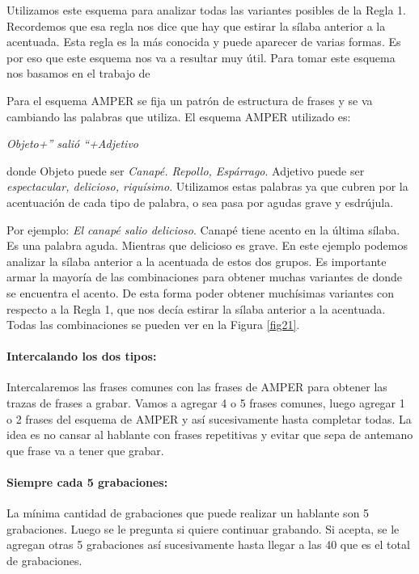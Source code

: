 Utilizamos este esquema para analizar todas las variantes posibles de la Regla 1. Recordemos que esa regla nos dice que hay que estirar la sílaba anterior a la acentuada. Esta regla es la más conocida y puede aparecer de varias formas. Es por eso que este esquema nos va a resultar muy útil. Para tomar este esquema nos basamos en el trabajo de \cite{amper}

Para el esquema AMPER se fija un patrón de estructura de frases y se va cambiando las palabras que utiliza. 
El esquema AMPER utilizado es: 
\begin{center}
\textit{Objeto+” salió “+Adjetivo} 
\end{center}
donde Objeto puede ser \textit{Canapé. Repollo, Espárrago}. Adjetivo puede ser \textit{espectacular, delicioso, riquísimo}. Utilizamos estas palabras ya que cubren por la acentuación de cada tipo de palabra, o sea pasa por agudas grave y esdrújula. 

Por ejemplo: \textit{El canapé salio delicioso}. Canapé tiene acento en la última sílaba. Es una palabra aguda. Mientras que delicioso es grave. En este ejemplo podemos analizar la sílaba anterior a la acentuada de estos dos grupos. Es importante armar la mayoría de las combinaciones para obtener muchas variantes de donde se encuentra el acento. De esta forma poder obtener muchísimas variantes con respecto a la Regla 1, que nos decía estirar la sílaba anterior a la acentuada. Todas las combinaciones se pueden ver en la Figura \ref{fig21}.


\paragraph{Intercalando los dos tipos:}
Intercalaremos las frases comunes con las frases de AMPER para obtener las trazas de frases a grabar. Vamos a agregar 4 o 5 frases comunes, luego agregar 1 o 2 frases del esquema de AMPER y así sucesivamente hasta completar todas. La idea es no cansar al hablante con frases repetitivas y evitar que sepa de antemano que frase va a tener que grabar.

\paragraph{Siempre cada 5 grabaciones:}
La mínima cantidad de grabaciones que puede realizar un hablante son 5 grabaciones. Luego se le pregunta si quiere continuar grabando. Si acepta, se le agregan otras 5 grabaciones así sucesivamente hasta llegar a las 40 que es el total de grabaciones.

